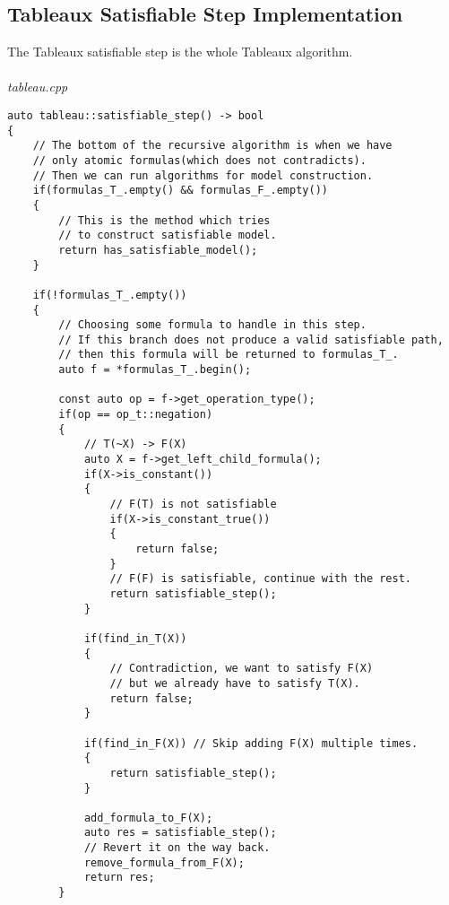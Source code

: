 \documentclass{article}
\begin{document}
	\subsection{Tableaux Satisfiable Step Implementation}
	The Tableaux satisfiable step is the whole Tableaux algorithm.
	\\
	\\
\noindent
\textit{tableau.cpp}
\begin{lstlisting}
auto tableau::satisfiable_step() -> bool
{
    // The bottom of the recursive algorithm is when we have
    // only atomic formulas(which does not contradicts).
    // Then we can run algorithms for model construction.
    if(formulas_T_.empty() && formulas_F_.empty())
    {
        // This is the method which tries
        // to construct satisfiable model.
        return has_satisfiable_model();
    }

    if(!formulas_T_.empty())
    {
        // Choosing some formula to handle in this step.
        // If this branch does not produce a valid satisfiable path,
        // then this formula will be returned to formulas_T_.
        auto f = *formulas_T_.begin();

        const auto op = f->get_operation_type();
        if(op == op_t::negation)
        {
            // T(~X) -> F(X)
            auto X = f->get_left_child_formula();
            if(X->is_constant())
            {
                // F(T) is not satisfiable
                if(X->is_constant_true())
                {
                    return false;
                }
                // F(F) is satisfiable, continue with the rest.
                return satisfiable_step();
            }

            if(find_in_T(X))
            {
                // Contradiction, we want to satisfy F(X)
                // but we already have to satisfy T(X).
                return false;
            }

            if(find_in_F(X)) // Skip adding F(X) multiple times.
            {
                return satisfiable_step();
            }

            add_formula_to_F(X);
            auto res = satisfiable_step();
            // Revert it on the way back.
            remove_formula_from_F(X);
            return res;
        }
\end{lstlisting}
\newpage
\end{document}
